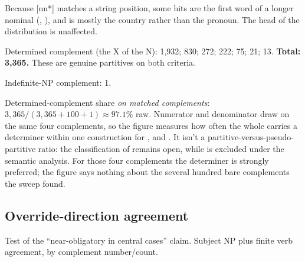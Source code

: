 Because [nn*] matches a string position, some hits are the first word of a longer nominal (, ), and  is mostly the country rather than the pronoun. The head of the distribution is unaffected.

Determined complement (the X of the N):  1,932;  830;  272;  222;  75;  21;  13. \textbf{Total: 3,365.} These are genuine partitives on both criteria.

Indefinite-NP complement:  1.

Determined-complement share \textit{on matched complements}: $3{,}365 / (3{,}365 + 100 + 1) \approx\! 97.1\%$ raw. Numerator and denominator draw on the same four complements, so the figure measures how often the whole carries a determiner within one construction for , and . It isn't a partitive-versus-pseudo-partitive ratio: the classification of  remains open, while  is excluded under the semantic analysis. For those four complements the determiner is strongly preferred; the figure says nothing about the several hundred bare complements the sweep found.

\subsection{Override-direction agreement}\label{sec:A-3}

Test of the \enquote{near-obligatory in central cases} claim. Subject NP plus finite verb agreement, by complement number/count.

